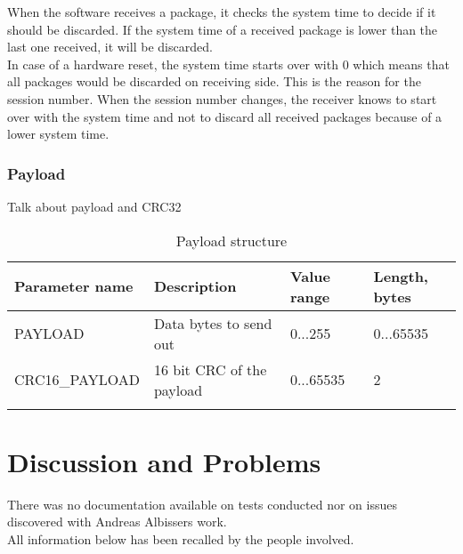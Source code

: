 When the software receives a package, it checks the system time to decide if it should be discarded. If the system time of a received package is lower than the last one received, it will be discarded.\\
In case of a hardware reset, the system time starts over with 0 which means that all packages would be discarded on receiving side. This is the reason for the session number. When the session number changes, the receiver knows to start over with the system time and not to discard all received packages because of a lower system time.\\
%
\subsubsection{Payload}
Talk about payload and CRC32
%
%
\begin{center}
    \begin{longtable}{p{3cm}p{8cm}p{2cm}p{1cm}}
        \hline
        \textbf{Parameter name} & \textbf{Description} & \textbf{Value range} & \textbf{Length, bytes} \\
        \hline
        PAYLOAD & Data bytes to send out & 0...255 & 0...65535\\
        \hline
        CRC16\_PAYLOAD &  16 bit CRC of the payload & 0...65535 & 2\\
        \hline
        \caption{Payload structure}
        \label{tab:tabPayloadStructure}    
    \end{longtable}
\end{center}
%
%
%
%
%
\section{Discussion and Problems} \label{sec:txtTeensy3.1SoftwareProblems}
There was no documentation available on tests conducted nor on issues discovered with Andreas Albissers work.\\
All information below has been recalled by the people involved.\\
%
%
